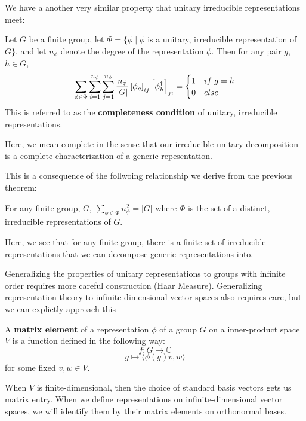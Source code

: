 \documentclass[compress,aspectratio=169,10pt,usenames,dvipsnames]{beamer}
\newcommand{\C}{\mathbb{C}}
\begin{document}
%
%
\begin{frame}
\vfill
We have a another very similar property that unitary irreducible representations meet:
\vfill
\begin{theorem}
	Let $G$ be a finite group, let $\Phi = \{\phi \mid \phi$ is a unitary, irreducible representation of $G\}$, and let $n_\phi$ denote the degree of the representation $\phi$. Then for any pair $g$, $h \in G$, 
$$\sum_{\phi \in \Phi} \sum_{i=1}^{n_\phi} \sum_{j=1}^{n_\phi} \frac{n_\phi}{|G|} \left[\phi_g\right]_{ij}\left[\phi_{h}^\dag\right]_{ji} = \begin{cases}
																										1 & if \hspace{1mm} g = h \\
																										0 & else
																									\end{cases}$$
This is referred to as the \textbf{completeness condition} of unitary, irreducible representations.
\end{theorem}
\vfill
Here, we mean complete in the sense that our irreducible unitary decomposition is a complete characterization of a generic repesentation. 
\vfill
\end{frame}

\begin{frame}
This is a consequence of the follwoing relationship we derive from the previous theorem:
\vfill
\begin{theorem}
	For any finite group, $G$, $\sum_{\phi \in \Phi} n_\phi^2 = |G|$ where $\Phi$ is the set of a distinct, irreducible representations of $G$.
\end{theorem}
\vfill
Here, we see that for any finite group, there is a finite set of irreducible representations that we can decompose generic representations into.
\vfill
\end{frame}
%
%
\begin{frame}
\vfill
Generalizing the properties of unitary representations to groups with infinite order requires more careful construction (Haar Measure).
\vfill
Generalizing representation theory to infinite-dimensional vector spaces also requires care, but we can explictly approach this
\vfill
\begin{definition}
	A \textbf{matrix element} of a representation $\phi$ of a group $G$ on a inner-product space $V$ is a function defined in the following way:
$$f:G\rightarrow\C$$
$$g\mapsto\langle\phi(g)v,w\rangle$$
for some fixed $v,w\in V$.
\vfill
\end{definition}
\vfill
\end{frame}
%
%
\begin{frame}
\vfill
When $V$ is finite-dimensional, then the choice of standard basis vectors gets us matrix entry.
\vfill
When we define representations on infinite-dimensional vector spaces, we will identify them by their matrix elements on orthonormal bases.
\vfill
\end{frame}
\end{document}
